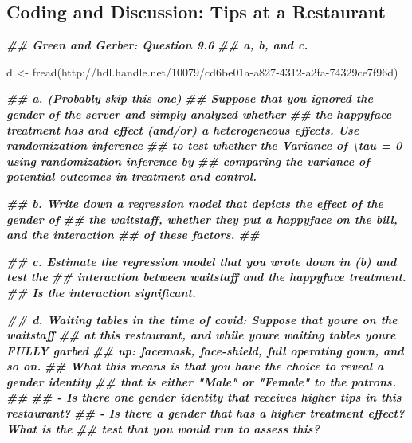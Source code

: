 \documentclass[
]{article}
\newenvironment{Shaded}{\begin{snugshade}}{\end{snugshade}}
\newcommand{\DocumentationTok}[1]{\textcolor[rgb]{0.56,0.35,0.01}{\textbf{\textit{#1}}}}
\newcommand{\FunctionTok}[1]{\textcolor[rgb]{0.00,0.00,0.00}{#1}}
\newcommand{\NormalTok}[1]{#1}
\newcommand{\OtherTok}[1]{\textcolor[rgb]{0.56,0.35,0.01}{#1}}
\newcommand{\StringTok}[1]{\textcolor[rgb]{0.31,0.60,0.02}{#1}}
\begin{document}
\hypertarget{coding-and-discussion-tips-at-a-restaurant}{%
\subsection{Coding and Discussion: Tips at a Restaurant}\label{coding-and-discussion-tips-at-a-restaurant}}

\begin{Shaded}
\begin{Highlighting}[]
\DocumentationTok{\#\# Green and Gerber: Question 9.6}
\DocumentationTok{\#\# a, b, and c. }

\NormalTok{d }\OtherTok{\textless{}{-}} \FunctionTok{fread}\NormalTok{(}\StringTok{\textquotesingle{}http://hdl.handle.net/10079/cd6be01a{-}a827{-}4312{-}a2fa{-}74329ce7f96d\textquotesingle{}}\NormalTok{)}

\DocumentationTok{\#\# a. (Probably skip this one)}
\DocumentationTok{\#\#    Suppose that you ignored the gender of the server and simply analyzed whether}
\DocumentationTok{\#\#    the happyface treatment has and effect (and/or) a heterogeneous effects. Use randomization inference }
\DocumentationTok{\#\#    to test whether the Variance of \textbackslash{}tau = 0 using randomization inference by }
\DocumentationTok{\#\#    comparing the variance of potential outcomes in treatment and control. }

\DocumentationTok{\#\# b. Write down a regression model that depicts the effect of the gender of }
\DocumentationTok{\#\#    the waitstaff, whether they put a happyface on the bill, and the interaction }
\DocumentationTok{\#\#    of these factors. }
\DocumentationTok{\#\# }

\DocumentationTok{\#\# c. Estimate the regression model that you wrote down in (b) and test the }
\DocumentationTok{\#\#    interaction between waitstaff and the happyface treatment. }
\DocumentationTok{\#\#    Is the interaction significant. }

\DocumentationTok{\#\# d. Waiting tables in the time of covid: Suppose that you\textquotesingle{}re on the waitstaff }
\DocumentationTok{\#\#    at this restaurant, and while you\textquotesingle{}re waiting tables you\textquotesingle{}re FULLY garbed }
\DocumentationTok{\#\#    up: facemask, face{-}shield, full operating gown, and so on. }
\DocumentationTok{\#\#    What this means is that you have the choice to reveal a gender identity}
\DocumentationTok{\#\#    that is either "Male" or "Female" to the patrons. }
\DocumentationTok{\#\# }
\DocumentationTok{\#\#    {-} Is there one gender identity that receives higher tips in this restaurant? }
\DocumentationTok{\#\#    {-} Is there a gender that has a higher treatment effect? What is the }
\DocumentationTok{\#\#      test that you would run to assess this? }
\end{Highlighting}
\end{Shaded}
\end{document}
